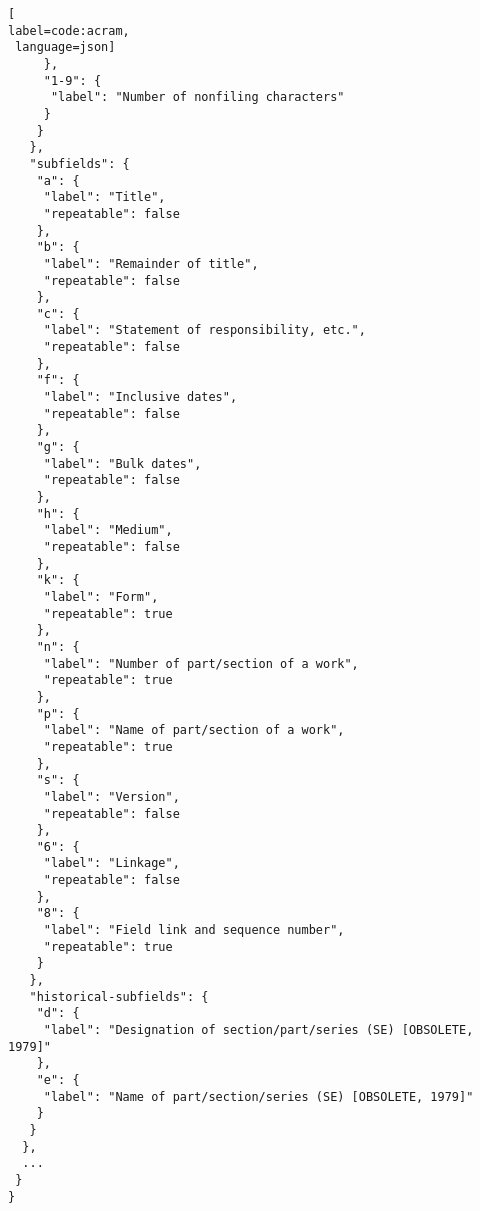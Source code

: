 \begin{scriptsize}
\begin{lstlisting}[
label=code:acram,
 language=json]
     },
     "1-9": {
      "label": "Number of nonfiling characters"
     }
    }
   },
   "subfields": {
    "a": {
     "label": "Title",
     "repeatable": false
    },
    "b": {
     "label": "Remainder of title",
     "repeatable": false
    },
    "c": {
     "label": "Statement of responsibility, etc.",
     "repeatable": false
    },
    "f": {
     "label": "Inclusive dates",
     "repeatable": false
    },
    "g": {
     "label": "Bulk dates",
     "repeatable": false
    },
    "h": {
     "label": "Medium",
     "repeatable": false
    },
    "k": {
     "label": "Form",
     "repeatable": true
    },
    "n": {
     "label": "Number of part/section of a work",
     "repeatable": true
    },
    "p": {
     "label": "Name of part/section of a work",
     "repeatable": true
    },
    "s": {
     "label": "Version",
     "repeatable": false
    },
    "6": {
     "label": "Linkage",
     "repeatable": false
    },
    "8": {
     "label": "Field link and sequence number",
     "repeatable": true
    }
   },
   "historical-subfields": {
    "d": {
     "label": "Designation of section/part/series (SE) [OBSOLETE, 1979]"
    },
    "e": {
     "label": "Name of part/section/series (SE) [OBSOLETE, 1979]"
    }
   }
  },
  ...
 }
}
\end{lstlisting}
\end{scriptsize}
